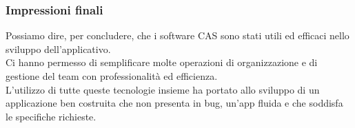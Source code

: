 \documentclass{beamer}
\begin{document}
\begin{frame}
\frametitle{Impressioni finali}
Possiamo dire, per concludere, che i software CAS sono stati utili ed efficaci nello sviluppo dell'applicativo. \\
Ci hanno permesso di semplificare molte operazioni di organizzazione e di gestione del team con professionalità ed efficienza.\\
L'utilizzo di tutte queste tecnologie insieme ha portato allo sviluppo di un applicazione ben costruita che non presenta in bug, un'app fluida e che soddisfa le specifiche richieste.
\end{frame}
\end{document}
